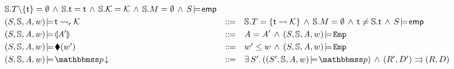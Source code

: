 \begin{figure*}[!t]
\[\begin{array}{lcl}
                \hpstate.\thrdpool\backslash\{\tid\} = \emptyset
                \,\land\,
                \hpstate.\tid = \tid
                \,\land\,
                \hpstate.\hthrdlocalst = \hthrdlocalst
                \,\land\,
                \hpstate.\Mem = \emptyset
                \,\land\, \asrtmodel{\state}{\aemp}
                \\
                \\[-9pt]
            \asrtmodel{(\state, \hpstate, \primcom, \word)}
                {\astRdyCont{\thrdid}{\hthrdlocalst}} & \define &
                \hpstate.\thrdpool =\{ \thrdid \rightsquigarrow \hthrdlocalst \}
                \, \land \, \hpstate.\Mem = \emptyset \, \land \,
                \tid \neq \hpstate.\tid\,\land\,
                \asrtmodel{\state}{\aemp} \\
            \\[-9pt]
            \asrtmodel{(\state, \hpstate, \primcom, \word)}
                {\safePrimAst{\primcom'}} & \define &
                \primcom = \primcom' \, \land \,
                \asrtmodel{(\state, \hpstate, \primcom, \word)}{\empAst} \\
            \\[-9pt]
            \asrtmodel{(\state, \hpstate, \primcom, \word)}
                {\metricAst{\word'}}
            & \define & \word' \leq \word \, \land \,
            \asrtmodel{(\state, \hpstate, \primcom, \word)}{\empAst} \\
            \\[-9pt]
            \asrtmodel{(\state, \hpstate, \primcom, \word)}{\nxtAst{\relastP}}
            & \define &
            \exists \, \state'. \,
            (\asrtmodel{(\state', \hpstate, \primcom, \word)}{\relastP})
            \, \land \, \Dstep{(\RFile', \DBuf')}{(\RFile, \DBuf)} \\

\end{array}\]
\end{figure*}
